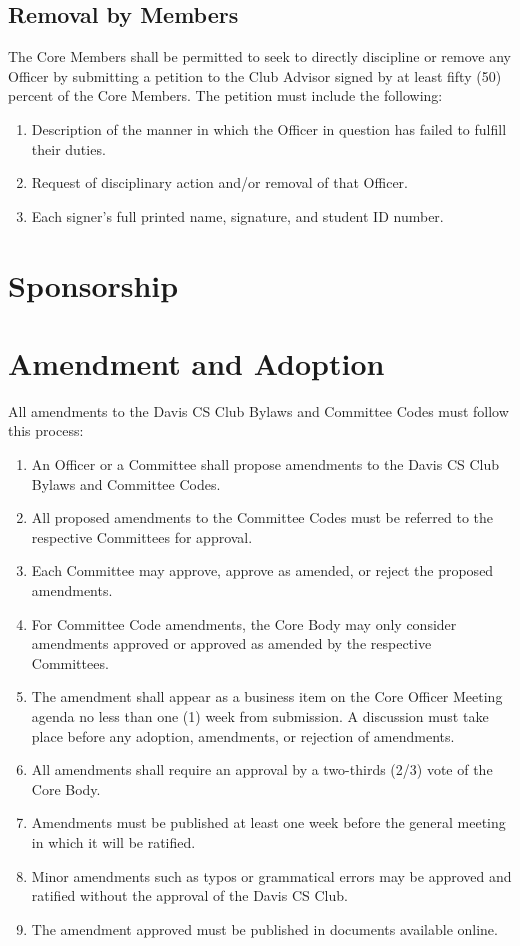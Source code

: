 \documentclass{article}
\newenvironment{li}{
\begin{enumerate}
  \setlength{\itemsep}{1pt}
  \setlength{\parskip}{0pt}
  \setlength{\parsep}{0pt}
}{\end{enumerate}}
\begin{document}
\subsection{Removal by Members}
The Core Members shall be permitted to seek to directly discipline or remove any Officer by submitting a petition to the Club Advisor signed by at least fifty (50) percent of the Core Members. The petition must include the following:
\begin{li}
\item Description of the manner in which the Officer in question has failed to fulfill their duties.
\item Request of disciplinary action and/or removal of that Officer.
\item Each signer's full printed name, signature, and student ID number.
\end{li}


\section{Sponsorship}


\section{Amendment and Adoption}
All amendments to the Davis CS Club Bylaws and Committee Codes must follow this process:
\begin{li}
\item An Officer or a Committee shall propose amendments to the Davis CS Club Bylaws and Committee Codes.
\item All proposed amendments to the Committee Codes must be referred to the respective Committees for approval.
\item Each Committee may approve, approve as amended, or reject the proposed amendments.
\item For Committee Code amendments, the Core Body may only consider amendments approved or approved as amended by the respective Committees.
\item The amendment shall appear as a business item on the Core Officer Meeting agenda no less than one (1) week from submission. A discussion must take place before any adoption, amendments, or rejection of amendments.
\item All amendments shall require an approval by a two-thirds (2/3) vote of the Core Body.
\item Amendments must be published at least one week before the general meeting in which it will be ratified.
\item Minor amendments such as typos or grammatical errors may be approved and ratified without the approval of the Davis CS Club.
\item The amendment approved must be published in documents available online.
\end{li}
\end{document}
